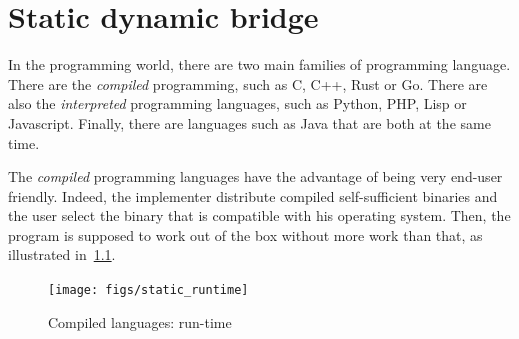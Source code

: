 \chapter{Static dynamic bridge}
\label{chap.static_dynamic_bridge}


In the programming world, there are two main families of programming language. There are the \emph{compiled}
programming, such as C, C++, Rust or Go. There are also the \emph{interpreted} programming languages, such as Python,
PHP, Lisp or Javascript. Finally, there are languages such as Java that are both at the same time.

The \emph{compiled} programming languages have the advantage of being very end-user friendly. Indeed, the implementer
distribute compiled self-sufficient binaries and the user select the binary that is compatible with his operating
system. Then, the program is supposed to work out of the box without more work than that, as illustrated
in~\cref{fig:static.dynamic.compiled.runtime}.

\begin{figure}[tbh]
  \centering
  \texttt{[image: figs/static\_runtime]}
  \caption{Compiled languages: run-time}
  \label{fig:static.dynamic.compiled.runtime}
\end{figure}

